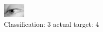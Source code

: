 \begin{figure}[h!]
\begin{center}
\includegraphics[width=0.60\columnwidth]{figures/ID2989_class_3_target_4.png}
\end{center}
\caption{ Classification: 3 actual target: 4}
\label{fig:ID2989_class_3_target_4}
\end{figure}
